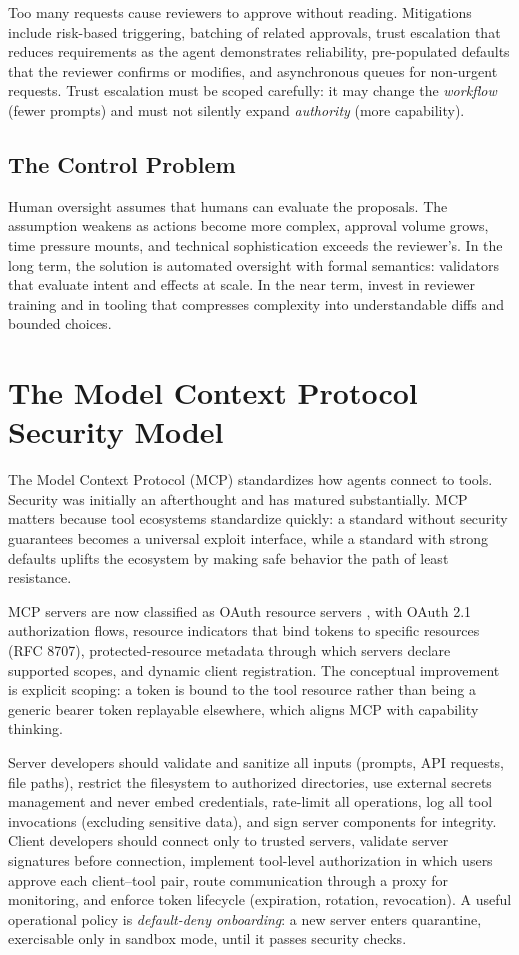 \documentclass[11pt]{book}
\begin{document}
Too many requests cause reviewers to approve without reading. Mitigations include risk-based triggering, batching of related approvals, trust escalation that reduces requirements as the agent demonstrates reliability, pre-populated defaults that the reviewer confirms or modifies, and asynchronous queues for non-urgent requests. Trust escalation must be scoped carefully: it may change the \textit{workflow} (fewer prompts) and must not silently expand \textit{authority} (more capability).

\subsection{The Control Problem}

Human oversight assumes that humans can evaluate the proposals. The assumption weakens as actions become more complex, approval volume grows, time pressure mounts, and technical sophistication exceeds the reviewer's. In the long term, the solution is automated oversight with formal semantics: validators that evaluate intent and effects at scale. In the near term, invest in reviewer training and in tooling that compresses complexity into understandable diffs and bounded choices.

\section{The Model Context Protocol Security Model}

The Model Context Protocol (MCP) \cite{mcp2025} standardizes how agents connect to tools. Security was initially an afterthought and has matured substantially. MCP matters because tool ecosystems standardize quickly: a standard without security guarantees becomes a universal exploit interface, while a standard with strong defaults uplifts the ecosystem by making safe behavior the path of least resistance.

MCP servers are now classified as OAuth resource servers \cite{mcpauth2025}, with OAuth 2.1 authorization flows, resource indicators that bind tokens to specific resources (RFC 8707), protected-resource metadata through which servers declare supported scopes, and dynamic client registration. The conceptual improvement is explicit scoping: a token is bound to the tool resource rather than being a generic bearer token replayable elsewhere, which aligns MCP with capability thinking.

Server developers should validate and sanitize all inputs (prompts, API requests, file paths), restrict the filesystem to authorized directories, use external secrets management and never embed credentials, rate-limit all operations, log all tool invocations (excluding sensitive data), and sign server components for integrity. Client developers should connect only to trusted servers, validate server signatures before connection, implement tool-level authorization in which users approve each client--tool pair, route communication through a proxy for monitoring, and enforce token lifecycle (expiration, rotation, revocation). A useful operational policy is \textit{default-deny onboarding}: a new server enters quarantine, exercisable only in sandbox mode, until it passes security checks.
\end{document}
